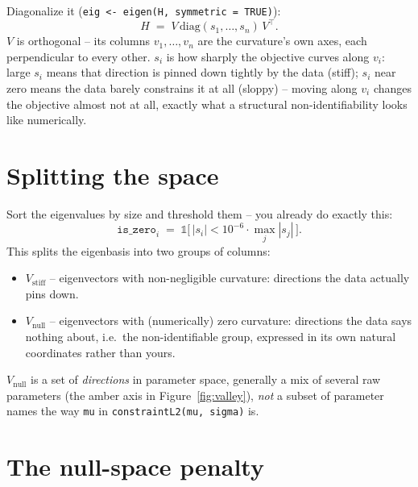 \documentclass[11pt]{article}
\newcommand{\code}[1]{\texttt{#1}}
\begin{document}
Diagonalize it (\code{eig <- eigen(H, symmetric = TRUE)}):
\begin{equation}
  H \;=\; V\,\mathrm{diag}(s_1,\ldots,s_n)\,V^\top .
\end{equation}
$V$ is orthogonal -- its columns $v_1,\ldots,v_n$ are the curvature's own
axes, each perpendicular to every other. $s_i$ is how sharply the objective
curves along $v_i$: large $s_i$ means that direction is pinned down tightly
by the data (stiff); $s_i$ near zero means the data barely constrains it at
all (sloppy) -- moving along $v_i$ changes the objective almost not at all,
exactly what a structural non-identifiability looks like numerically.

\section{Splitting the space}

Sort the eigenvalues by size and threshold them -- you already do exactly
this:
\begin{equation}
  \texttt{is\_zero}_i \;=\; \mathbb{1}\big[\,|s_i| < 10^{-6}\cdot\max_j |s_j|\,\big].
\end{equation}
This splits the eigenbasis into two groups of columns:
\begin{itemize}
  \item $V_{\mathrm{stiff}}$ -- eigenvectors with non-negligible curvature: directions the data actually pins down.
  \item $V_{\mathrm{null}}$ -- eigenvectors with (numerically) zero curvature: directions the data says nothing about, i.e.\ the non-identifiable group, expressed in its own natural coordinates rather than yours.
\end{itemize}
$V_{\mathrm{null}}$ is a set of \emph{directions} in parameter space,
generally a mix of several raw parameters (the amber axis in
Figure~\ref{fig:valley}), \emph{not} a subset of parameter names the way
\code{mu} in \code{constraintL2(mu, sigma)} is.

\section{The null-space penalty}
\end{document}

